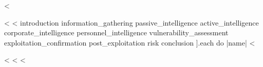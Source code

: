 \documentclass[10pt, a4paper, twoside]{report}
\begin{document}
  

  \tableofcontents

  \sloppy

  <%

  <%
    <%
      introduction
      information_gathering
      passive_intelligence
      active_intelligence
      corporate_intelligence
      personnel_intelligence
      vulnerability_assessment
      exploitation_confirmation
      post_exploitation
      risk
      conclusion
    ].each do |name| %
      <%
        
      <%
    <%
  <%

  \printbibliography{}
\end{document}
